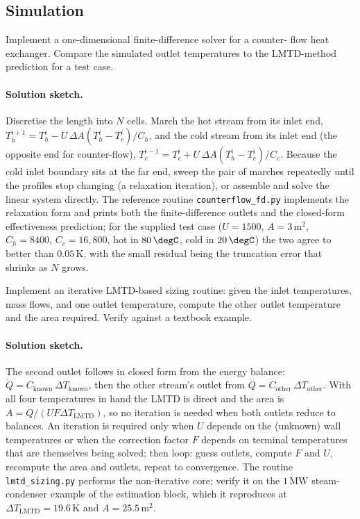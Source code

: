 \subsection*{Simulation}

\begin{exercise}
Implement a one-dimensional finite-difference solver for a counter-
flow heat exchanger. Compare the simulated outlet temperatures to
the LMTD-method prediction for a test case.

\paragraph{Solution sketch.} Discretise the length into $N$ cells. March
the hot stream from its inlet end, $T_h^{i+1} = T_h^{i} - U\,\Delta A
(T_h^{i} - T_c^{i})/C_h$, and the cold stream from its inlet end (the
opposite end for counter-flow), $T_c^{i-1} = T_c^{i} + U\,\Delta A
(T_h^{i} - T_c^{i})/C_c$. Because the cold inlet boundary sits at the
far end, sweep the pair of marches repeatedly until the profiles stop
changing (a relaxation iteration), or assemble and solve the linear
system directly. The reference routine
\texttt{counterflow\_fd.py} implements the relaxation form and prints
both the finite-difference outlets and the closed-form effectiveness
prediction; for the supplied test case ($U = 1500$, $A = 3\,\text{m}^2$,
$C_h = 8400$, $C_c = 16{,}800$, hot in $80\,\degC$, cold in $20\,\degC$)
the two agree to better than $0.05\,\si{\kelvin}$, with the small
residual being the truncation error that shrinks as $N$ grows.
\end{exercise}

\begin{exercise}
Implement an iterative LMTD-based sizing routine: given the inlet
temperatures, mass flows, and one outlet temperature, compute the
other outlet temperature and the area required. Verify against a
textbook example.

\paragraph{Solution sketch.} The second outlet follows in closed form from
the energy balance: $\dot{Q} = C_{\text{known}}\,\Delta T_{\text{known}}$,
then the other stream's outlet from $\dot{Q} = C_{\text{other}}\,\Delta
T_{\text{other}}$. With all four temperatures in hand the LMTD is direct
and the area is $A = \dot{Q}/(U F \Delta T_{\text{LMTD}})$, so no
iteration is needed when both outlets reduce to balances. An iteration
is required only when $U$ depends on the (unknown) wall temperatures or
when the correction factor $F$ depends on terminal temperatures that
are themselves being solved; then loop: guess outlets, compute $F$ and
$U$, recompute the area and outlets, repeat to convergence. The routine
\texttt{lmtd\_sizing.py} performs the non-iterative core; verify it on
the $1\,\text{MW}$ steam-condenser example of the estimation block,
which it reproduces at $\Delta T_{\text{LMTD}} = 19.6\,\si{\kelvin}$ and
$A = 25.5\,\text{m}^2$.
\end{exercise}

